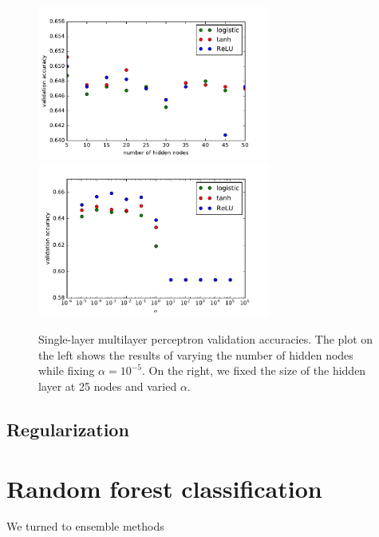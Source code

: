 \documentclass{article}
\begin{document}
\begin{multicols}{2}
\begin{figure}[t] %
   \centering
   \includegraphics[width=3in]{img/mlp-one-hidden-layer.pdf}
   \includegraphics[width=3in]{img/mlp-alpha-experiment.pdf}
   \caption{Single-layer multilayer perceptron validation accuracies.
   The plot on the left shows the results of varying the number of hidden nodes
   while fixing $\alpha = 10^{-5}$.
   On the right, we fixed the size of the hidden layer at 25 nodes
   and varied $\alpha$.}
   \label{fig:mlp-plots}
\end{figure}


\subsection{Regularization}





\section{Random forest classification}

We turned to ensemble methods %


\end{multicols}
\end{document}
